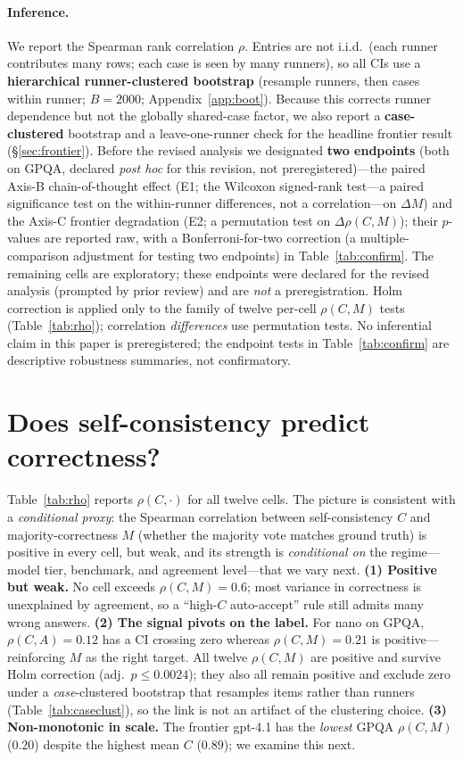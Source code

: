 \documentclass[11pt]{article}
\newcommand{\C}{\textit{C}}
\newcommand{\A}{\textit{A}}
\newcommand{\Mlab}{\textit{M}}
\begin{document}
\paragraph{Inference.} We report the Spearman rank correlation $\rho$. Entries are not i.i.d.\ (each runner contributes
many rows; each case is seen by many runners), so all CIs use a \textbf{hierarchical runner-clustered
bootstrap} (resample runners, then cases within runner; $B{=}2000$; Appendix~\ref{app:boot}). Because
this corrects runner dependence but not the globally shared-case factor, we also report a
\textbf{case-clustered} bootstrap and a leave-one-runner check for the headline frontier result
(\S\ref{sec:frontier}). Before the revised analysis we designated \textbf{two endpoints} (both on GPQA, declared
\emph{post hoc} for this revision, not preregistered)---the paired Axis-B chain-of-thought effect
(E1; the Wilcoxon signed-rank test---a paired significance test on the within-runner differences, not a correlation---on $\Delta\Mlab$) and the Axis-C frontier degradation (E2; a permutation test on
$\Delta\rho(\C,\Mlab)$); their $p$-values are reported raw, with a Bonferroni-for-two correction (a multiple-comparison adjustment for testing two endpoints) in
Table~\ref{tab:confirm}. The remaining cells are exploratory; these endpoints were declared for the revised
analysis (prompted by prior review) and are \emph{not} a preregistration. Holm correction is applied
only to the family of twelve per-cell $\rho(\C,\Mlab)$ tests (Table~\ref{tab:rho}); correlation
\emph{differences} use permutation tests. No inferential claim in this paper is preregistered; the
endpoint tests in Table~\ref{tab:confirm} are descriptive robustness summaries, not confirmatory.

\section{Does self-consistency predict correctness?}
\label{sec:headline}
Table~\ref{tab:rho} reports $\rho(\C,\cdot)$ for all twelve cells. The picture is consistent with a
\emph{conditional proxy}: the Spearman correlation between self-consistency $\C$ and majority-correctness
$\Mlab$ (whether the majority vote matches ground truth) is positive in every cell, but weak, and its
strength is \emph{conditional on} the regime---model tier, benchmark, and agreement level---that we vary next.
\textbf{(1) Positive but weak.} No cell exceeds $\rho(\C,\Mlab)=0.6$; most variance in correctness
is unexplained by agreement, so a ``high-$\C$ auto-accept'' rule still admits many wrong answers.
\textbf{(2) The signal pivots on the label.} For nano on GPQA, $\rho(\C,\A)=0.12$ has a CI crossing
zero whereas $\rho(\C,\Mlab)=0.21$ is positive---reinforcing $\Mlab$ as the right target. All twelve
$\rho(\C,\Mlab)$ are positive and survive Holm correction (adj.\ $p\leq0.0024$); they also all remain
positive and exclude zero under a \emph{case}-clustered bootstrap that resamples items rather than
runners (Table~\ref{tab:caseclust}), so the link is not an artifact of the clustering choice.
\textbf{(3) Non-monotonic in scale.} The frontier gpt-4.1 has the \emph{lowest} GPQA
$\rho(\C,\Mlab)$ ($0.20$) despite the highest mean $\C$ ($0.89$); we examine this next.
\end{document}
